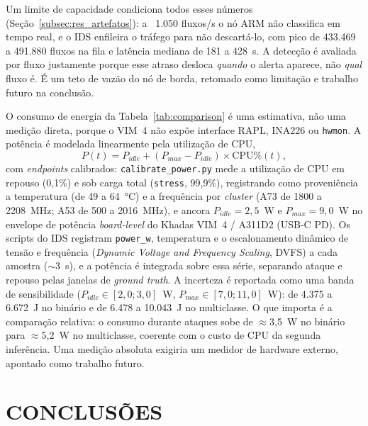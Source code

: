 \documentclass[12pt,a4paper]{article}
\begin{document}
Um limite de capacidade condiciona todos esses números
(Seção~\ref{subsec:res_artefatos}): a ~1.050 fluxos/s o nó ARM não classifica em
tempo real, e o IDS enfileira o tráfego para não descartá-lo, com pico de 433.469
a 491.880 fluxos na fila e latência mediana de 181 a 428~s. A detecção é avaliada
por fluxo justamente porque esse atraso desloca \emph{quando} o alerta aparece, não
\emph{qual} fluxo é. É um teto de vazão do nó de borda, retomado como limitação e
trabalho futuro na conclusão.

O consumo de energia da Tabela~\ref{tab:comparison} é uma estimativa, não uma
medição direta, porque o VIM~4 não expõe interface RAPL, INA226 ou
\texttt{hwmon}. A potência é modelada linearmente pela utilização de CPU,
\begin{equation}
P(t) = P_{idle} + (P_{max} - P_{idle}) \times \text{CPU\%}(t),
\label{eq:power}
\end{equation}
com \textit{endpoints} calibrados: \texttt{calibrate\_power.py} mede a utilização
de CPU em repouso (0,1\%) e sob carga total (\texttt{stress}, 99,9\%),
registrando como proveniência a temperatura (de 49 a 64~°C) e a frequência por
\textit{cluster} (A73 de 1800 a 2208~MHz; A53 de 500 a 2016~MHz), e ancora
$P_{idle} = 2{,}5$~W e $P_{max} = 9{,}0$~W no envelope de potência
\textit{board-level} do Khadas VIM~4 / A311D2 (USB-C PD). Os scripts do IDS
registram \texttt{power\_w}, temperatura e o escalonamento dinâmico de tensão e
frequência (\textit{Dynamic Voltage and Frequency Scaling}, DVFS) a cada amostra
($\sim$3~s), e a potência é integrada sobre essa série, separando ataque e
repouso pelas janelas de \textit{ground truth}. A incerteza é reportada como uma
banda de sensibilidade ($P_{idle} \in [2{,}0;3{,}0]$~W, $P_{max} \in
[7{,}0;11{,}0]$~W): de 4.375 a 6.672~J no binário e de 6.478 a 10.043~J no
multiclasse. O que importa é a comparação relativa: o consumo durante ataques
sobe de $\approx$3,5~W no binário para $\approx$5,2~W no multiclasse, coerente com
o custo de CPU da segunda inferência. Uma medição absoluta exigiria um medidor de
hardware externo, apontado como trabalho futuro.

\section{CONCLUSÕES}
\label{sec:conclusoes}
\end{document}
